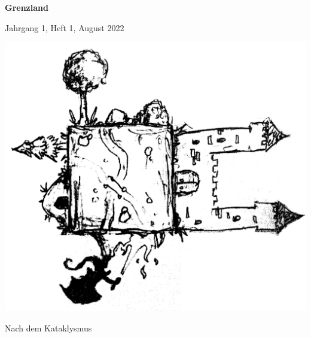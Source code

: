 \documentclass[11pt]{wbzine}
\begin{document}
\begin{titlepage}
\centering
{\bfseries\fontsize{70}{55}\selectfont Grenzland}

\hrulefill Jahrgang 1, Heft 1, August 2022
    \vspace{1cm}

	  \includegraphics[width=\textwidth]{Coverimage.png}

    \vspace{1cm}
{\Huge Nach dem Kataklysmus\par}%

\end{titlepage}

\tableofcontents
\end{document}
